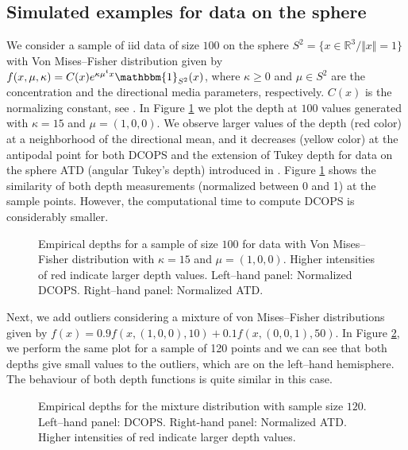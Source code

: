 \documentclass[a4paper]{article}
\numberwithin{equation}{section}
\newcommand{\I}{\mathbbm{1}}
\begin{document}
\subsection{Simulated examples for data on the sphere}
We consider a sample of iid data of size $100$ on the sphere $S^2=\{ x \in \mathbb{R}^3 /  \Vert x \Vert= 1\}$ with Von Mises--Fisher distribution given by
$f(x,\mu,\kappa)= C(x) e^{\kappa \mu^t x} \I_{ S^2}(x)$,
where $\kappa \geq 0$  and $\mu \in S^2$ are the concentration and the directional media parameters, respectively. $C(x)$ is the normalizing constant, see \cite{mardia2000}.
In Figure \ref{prof_esfera} we plot the depth at  $100$ values generated with $\kappa =15$  and $\mu= (1,0,0)$.  We observe larger values of the depth (red color) at a neighborhood of the directional mean, and it decreases (yellow color) at the antipodal point for both DCOPS and the extension of Tukey depth for data on the sphere ATD (angular Tukey's depth) introduced in \cite{liu1992b}. Figure \ref{prof_esfera} shows the similarity of both depth measurements (normalized between 0 and 1) at the sample points. However, the computational time to compute  DCOPS is considerably smaller.
\begin{figure}[!ht] 
\centering
{}
\caption{ Empirical depths for a sample of size $100$ for data with  Von Mises--Fisher distribution with $\kappa =15$  and $\mu= (1,0,0)$. Higher intensities of red indicate larger depth values.  Left--hand panel:  Normalized DCOPS. Right--hand panel:  Normalized ATD.} \label{prof_esfera}  
\end{figure}
Next, we add outliers considering a mixture of von Mises--Fisher distributions given by  
$f(x)= 0.9 f(x,(1,0,0),10) + 0.1 f(x,(0,0,1),50)$.
In Figure \ref{prof_esfera_out}, we perform the same plot for a sample of 120 points and we can see that both depths give small values to the outliers, which are on the left--hand hemisphere. The behaviour of both depth functions is quite similar in this case.
\begin{figure}[!ht]
\centering
{}
\caption{ Empirical depths for the mixture distribution with sample size $120$. Left--hand panel: DCOPS. Right-hand panel:  Normalized ATD. Higher intensities of red indicate larger depth values.}  \label{prof_esfera_out}  
\end{figure}
\end{document}
